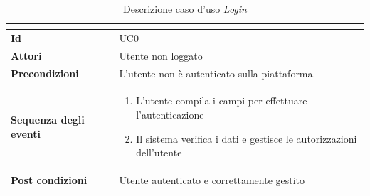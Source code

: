 \documentclass[a4paper]{article}
\begin{document}
\begin{table}[H]
\centering
\renewcommand{\arraystretch}{1.5}
\begin{tabular}{|>{\bfseries}l|p{10cm}|}
\hline
\multicolumn{2}{|c|}{\textbf{Caso d'uso: Login}} \\
\hline
\textbf{Id} & UC$0$ \\ \hline
\textbf{Attori} & Utente non loggato \\ \hline
\textbf{Precondizioni} & L’utente non è autenticato sulla piattaforma. \\ \hline
\textbf{Sequenza degli eventi} &
\begin{enumerate}
    \item L’utente compila i campi per effettuare l'autenticazione
    \item Il sistema verifica i dati e gestisce le autorizzazioni dell'utente
\end{enumerate}\\ \hline
\textbf{Post condizioni} & Utente autenticato e correttamente gestito \\ \hline
\end{tabular}
\caption{Descrizione caso d'uso \textit{Login}}
\label{tab:login-usecase}
\end{table}
\end{document}
